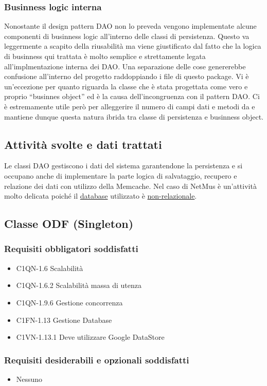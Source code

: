 \subsubsection*{Businness logic interna} Nonostante il design pattern DAO non lo
preveda vengono implementate alcune componenti di businness logic all'interno
delle classi di persistenza. Questo va leggermente a scapito della riusabilit\`a
ma viene giustificato dal fatto che la logica di businness qui trattata \`e
molto semplice e strettamente legata all'implmentazione interna dei DAO. Una
separazione delle cose genererebbe confusione all'interno del progetto
raddoppiando i file di questo package. Vi \`e un'eccezione per quanto
riguarda la classe  che \`e stata
progettata come vero e proprio ``businnes object'' ed \`e la causa
dell'incongruenza con il pattern DAO. Ci \`e estremamente utile per\`o per
alleggerire il numero di campi dati e metodi da  e mantiene
dunque questa natura ibrida tra classe di persistenza e businness object.

\subsection*{Attivit\`a svolte e dati trattati} Le classi DAO
gestiscono i dati del sistema garantendone la persistenza e si occupano anche di implementare la parte logica di salvataggio, recupero e
relazione dei dati con utilizzo della Memcache. Nel caso di NetMus \`e
un'attivit\`a molto delicata poich\'e il \underline{database} utilizzato \`e \underline{non-relazionale}.

\subsection{Classe ODF (Singleton)}
\subsubsection*{Requisiti obbligatori soddisfatti}
\begin{itemize}
    \item C1QN-1.6 Scalabilit\`a
    \item C1QN-1.6.2 Scalabilit\`a massa di utenza
    \item C1QN-1.9.6 Gestione concorrenza
    \item C1FN-1.13 Gestione Database
    \item C1VN-1.13.1 Deve utilizzare Google DataStore
\end{itemize}
\subsubsection*{Requisiti desiderabili e opzionali soddisfatti}
\begin{itemize}
    \item Nessuno
\end{itemize}
